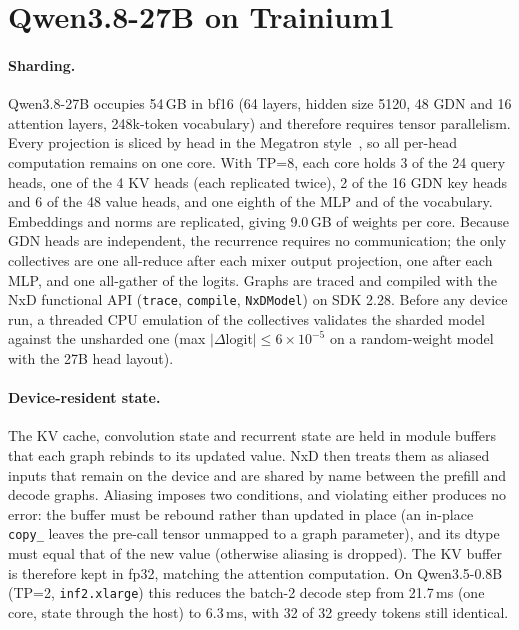 \documentclass[11pt]{article}
\theoremstyle{remark}
\begin{document}
\section{Qwen3.8-27B on Trainium1}\label{sec:27b}
\paragraph{Sharding.} Qwen3.8-27B occupies 54\,GB in bf16 (64 layers, hidden size 5120, 48 GDN and 16 attention layers,
248k-token vocabulary) and therefore requires tensor parallelism. Every projection is sliced by head in the Megatron
style~\cite{shoeybi2019megatron}, so all per-head computation remains on one core. With TP=8, each core holds 3 of the 24
query heads, one of the 4 KV heads (each replicated twice), 2 of the 16 GDN key heads and 6 of the 48 value heads, and one
eighth of the MLP and of the vocabulary. Embeddings and norms are replicated, giving 9.0\,GB of weights per core. Because GDN
heads are independent, the recurrence requires no communication; the only collectives are one all-reduce after each mixer
output projection, one after each MLP, and one all-gather of the logits. Graphs are traced and compiled with the NxD
functional API (\texttt{trace}, \texttt{compile}, \texttt{NxDModel}) on SDK 2.28. Before any device run, a threaded CPU
emulation of the collectives validates the sharded model against the unsharded one (max
$|\Delta\text{logit}|\le6\times10^{-5}$ on a random-weight model with the 27B head layout).

\paragraph{Device-resident state.} The KV cache, convolution state and recurrent state are held in module buffers that each
graph rebinds to its updated value. NxD then treats them as aliased inputs that remain on the device and are shared by name
between the prefill and decode graphs. Aliasing imposes two conditions, and violating either produces no error: the buffer
must be rebound rather than updated in place (an in-place \texttt{copy\_} leaves the pre-call tensor unmapped to a graph
parameter), and its dtype must equal that of the new value (otherwise aliasing is dropped). The KV buffer is therefore kept
in fp32, matching the attention computation. On Qwen3.5-0.8B (TP=2, \texttt{inf2.xlarge}) this reduces the batch-2 decode
step from 21.7\,ms (one core, state through the host) to 6.3\,ms, with 32 of 32 greedy tokens still identical.
\end{document}
